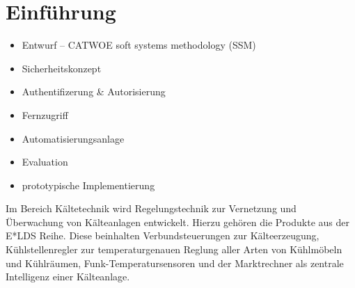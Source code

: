 \documentclass[11pt,a4paper]{report}
\begin{document}

\tableofcontents
\clearpage 


\chapter{Einführung} \label{chap:intro}

\begin{itemize}
\item Entwurf -- CATWOE soft systems methodology (SSM)
\item Sicherheitskonzept
\item Authentifizerung \& Autorisierung
\item Fernzugriff
\item Automatisierungsanlage
\item Evaluation
\item prototypische Implementierung
\end{itemize}
 
Im Bereich Kältetechnik wird Regelungstechnik zur Vernetzung und Überwachung von Kälteanlagen entwickelt. Hierzu gehören die Produkte aus der E*LDS Reihe. Diese beinhalten Verbundsteuerungen zur Kälteerzeugung, Kühlstellenregler zur temperaturgenauen Reglung aller Arten von Kühlmöbeln und Kühlräumen, Funk-Temperatursensoren und der Marktrechner als zentrale Intelligenz einer Kälteanlage.
\end{document}
